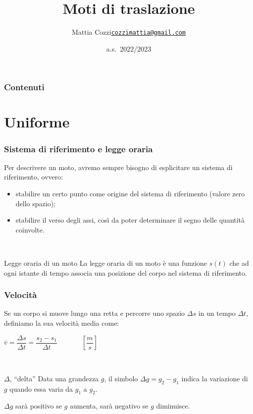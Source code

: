 \documentclass[]{beamer}
\title{Moti di traslazione}
\author{\texorpdfstring{Mattia Cozzi\newline\href{mailto:cozzimattia@gmail.com}{\texttt{cozzimattia@gmail.com}}}{Mattia Cozzi}}
\date{a.s.~2022/2023}
\theoremstyle{plain}
\begin{document}
\begin{frame}
  \titlepage
\end{frame}





\begin{frame}
\frametitle{Contenuti}
\tableofcontents
\end{frame}






\section{Uniforme}

\begin{frame}
\frametitle{Sistema di riferimento e legge oraria}
Per descrivere un moto, avremo \alert<1>{sempre} bisogno di esplicitare un sistema di riferimento, ovvero:\pause
\begin{itemize}
  \item stabilire un certo punto come \alert<2>{origine del sistema di riferimento} (valore zero dello spazio);\pause
  \item stabilire il \alert<3>{verso degli assi}, così da poter determinare il segno delle quantità coinvolte.
\end{itemize}\pause

~

\begin{block}{Legge oraria di un moto}
La legge oraria di un moto è una funzione $ s(t) $ che ad ogni istante di tempo associa una posizione del corpo nel sistema di riferimento.
\end{block}
\end{frame}


\begin{frame}
\frametitle{Velocità}
Se un corpo si muove lungo una retta e percorre uno spazio $ \Delta s $ in un tempo $ \Delta t $, definiamo la sua \alert{velocità media} come:
\begin{center}
\colorbox{blue!30}{$ \overline{v} = \dfrac{\Delta s}{\Delta t} = \dfrac{s_{2} - s_1}{\Delta t} $}~~~~~~~$ \left[ \dfrac{m}{s} \right] $
\end{center}\pause

~

\begin{block}{$ \Delta $, ``delta''}
Data una grandezza $ g $, il simbolo $ \Delta g = g_2 - g_1 $ indica la
\alert{variazione} di $ g $ quando essa varia da $ g_1 $ a $ g_2 $.

$ \Delta g $ sarà positivo se $ g $ aumenta, sarà negativo se $ g $ diminuisce.
\end{block}
\end{frame}
\end{document}
